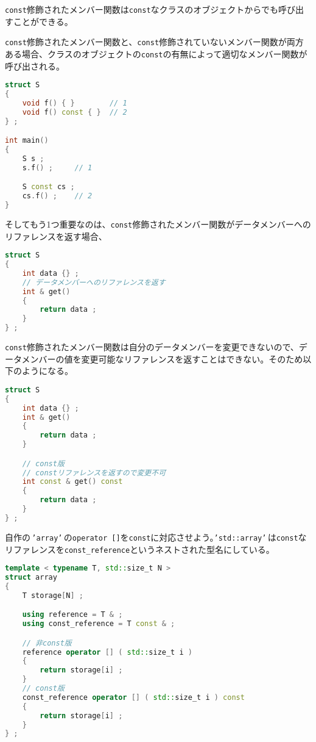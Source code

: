 \texttt{const}修飾されたメンバー関数は\texttt{const}なクラスのオブジェクトからでも呼び出すことができる。

\texttt{const}修飾されたメンバー関数と、\texttt{const}修飾されていないメンバー関数が両方ある場合、クラスのオブジェクトの\texttt{const}の有無によって適切なメンバー関数が呼び出される。

\begin{lstlisting}[language={C++}]
struct S
{
    void f() { }        // 1
    void f() const { }  // 2
} ;

int main()
{
    S s ;
    s.f() ;     // 1

    S const cs ;
    cs.f() ;    // 2
}
\end{lstlisting}

そしてもう1つ重要なのは、\texttt{const}修飾されたメンバー関数がデータメンバーへのリファレンスを返す場合、
\begin{lstlisting}[language={C++}]
struct S
{
    int data {} ;
    // データメンバーへのリファレンスを返す
    int & get()
    {
        return data ;
    }
} ;
\end{lstlisting}
\texttt{const}修飾されたメンバー関数は自分のデータメンバーを変更できないので、データメンバーの値を変更可能なリファレンスを返すことはできない。そのため以下のようになる。

\begin{lstlisting}[language={C++}]
struct S
{
    int data {} ;
    int & get()
    {
        return data ;
    }

    // const版
    // constリファレンスを返すので変更不可
    int const & get() const
    {
        return data ;
    }
} ;
\end{lstlisting}

自作の\,\texttt{'array'}\,の\texttt{operator []}を\texttt{const}に対応させよう。\texttt{'std::array'}\,は\texttt{const}なリファレンスを\texttt{const\_reference}というネストされた型名にしている。

\begin{lstlisting}[language={C++}]
template < typename T, std::size_t N >
struct array
{
    T storage[N] ;

    using reference = T & ;
    using const_reference = T const & ;

    // 非const版
    reference operator [] ( std::size_t i )
    {
        return storage[i] ;
    }
    // const版
    const_reference operator [] ( std::size_t i ) const
    {
        return storage[i] ;
    }
} ;
\end{lstlisting}

